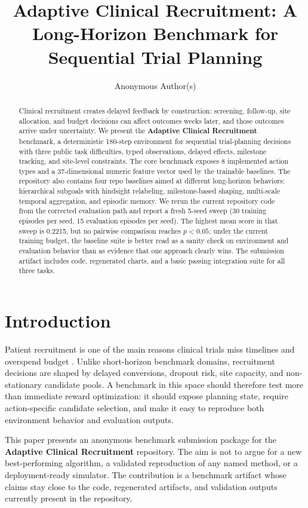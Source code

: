 \documentclass{article}
\title{Adaptive Clinical Recruitment: A Long-Horizon Benchmark for Sequential Trial Planning}
\author{Anonymous Author(s)}
\begin{document}
\maketitle

\begin{abstract}
Clinical recruitment creates delayed feedback by construction: screening, follow-up, site allocation, and budget decisions can affect outcomes weeks later, and those outcomes arrive under uncertainty. We present the \textbf{Adaptive Clinical Recruitment} benchmark, a deterministic 180-step environment for sequential trial-planning decisions with three public task difficulties, typed observations, delayed effects, milestone tracking, and site-level constraints. The core benchmark exposes 8 implemented action types and a 37-dimensional numeric feature vector used by the trainable baselines. The repository also contains four repo baselines aimed at different long-horizon behaviors: hierarchical subgoals with hindsight relabeling, milestone-based shaping, multi-scale temporal aggregation, and episodic memory. We rerun the current repository code from the corrected evaluation path and report a fresh 5-seed sweep (30 training episodes per seed, 15 evaluation episodes per seed). The highest mean score in that sweep is 0.2215, but no pairwise comparison reaches $p < 0.05$; under the current training budget, the baseline suite is better read as a sanity check on environment and evaluation behavior than as evidence that one approach clearly wins. The submission artifact includes code, regenerated charts, and a basic passing integration suite for all three tasks.
\end{abstract}

\section{Introduction}

Patient recruitment is one of the main reasons clinical trials miss timelines and overspend budget \citep{fogel2018}. Unlike short-horizon benchmark domains, recruitment decisions are shaped by delayed conversions, dropout risk, site capacity, and non-stationary candidate pools. A benchmark in this space should therefore test more than immediate reward optimization: it should expose planning state, require action-specific candidate selection, and make it easy to reproduce both environment behavior and evaluation outputs.

This paper presents an anonymous benchmark submission package for the \textbf{Adaptive Clinical Recruitment} repository. The aim is not to argue for a new best-performing algorithm, a validated reproduction of any named method, or a deployment-ready simulator. The contribution is a benchmark artifact whose claims stay close to the code, regenerated artifacts, and validation outputs currently present in the repository.
\end{document}
